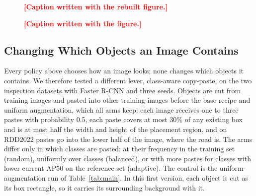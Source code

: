 \documentclass[conference]{IEEEtran}
\newcommand{\todo}[1]{\textcolor{red}{\textbf{[#1]}}}
\begin{document}
\begin{figure}[t]
\centering
{}
\caption{\todo{Caption written with the rebuilt figure.}}
\label{fig:forest}
\end{figure}

\begin{figure}[t]
\centering
{}
\caption{\todo{Caption written with the figure.}}
\label{fig:agreement}
\end{figure}

\subsection{Changing Which Objects an Image Contains}
\label{sec:results_paste}

Every policy above chooses how an image looks; none changes which objects it contains. We therefore tested a different lever, class-aware copy-paste, on the two inspection datasets with Faster R-CNN and three seeds. Objects are cut from training images and pasted into other training images before the base recipe and uniform augmentation, which all arms keep: each image receives one to three pastes with probability 0.5, each paste covers at most 30\% of any existing box and is at most half the width and height of the placement region, and on RDD2022 pastes go into the lower half of the image, where the road is. The arms differ only in which classes are pasted: at their frequency in the training set (random), uniformly over classes (balanced), or with more pastes for classes with lower current AP50 on the reference set (adaptive). The control is the uniform-augmentation run of Table~\ref{tab:main}. In this first version, each object is cut as its box rectangle, so it carries its surrounding background with it.
\end{document}
